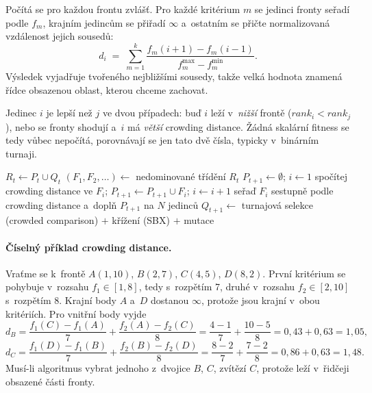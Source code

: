 \documentclass[11pt,a4paper]{article}
\theoremstyle{definition}
\begin{document}
\begin{defbox}
Počítá se pro každou frontu zvlášť. Pro každé kritérium $m$ se jedinci fronty seřadí
podle $f_m$, krajním jedincům se přiřadí $\infty$ a~ostatním se přičte normalizovaná
vzdálenost jejich sousedů:
\[
d_i \;=\; \sum_{m=1}^{k}
\frac{f_m(i+1) - f_m(i-1)}{f_m^{\max} - f_m^{\min}} .
\]
Výsledek vyjadřuje  tvořeného nejbližšími sousedy, takže velká hodnota
znamená řídce obsazenou oblast, kterou chceme zachovat.
\end{defbox}

\begin{defbox}
Jedinec $i$ je lepší než $j$ ve dvou případech: buď $i$ leží v~\emph{nižší} frontě
($rank_i < rank_j$), nebo se fronty shodují a~$i$ má \emph{větší} crowding distance.
Žádná skalární fitness se tedy vůbec nepočítá, porovnávají se jen tato dvě čísla,
typicky v~binárním turnaji.
\end{defbox}

\begin{algorithm}[!ht]
\caption{NSGA-II (jedna generace)}
\begin{algorithmic}[1]
\State $R_t \gets P_t \cup Q_t$ 
\State $(F_1, F_2, \dots) \gets$ nedominované třídění $R_t$
\State $P_{t+1} \gets \emptyset$; $i \gets 1$
  \State spočítej crowding distance ve $F_i$; $P_{t+1} \gets P_{t+1} \cup F_i$; $i \gets i+1$
\EndWhile
\State seřaď $F_i$ sestupně podle crowding distance a~doplň $P_{t+1}$ na $N$ jedinců
\State $Q_{t+1} \gets$ turnajová selekce (crowded comparison) $+$ křížení (SBX) $+$ mutace
\end{algorithmic}
\end{algorithm}

\paragraph{Číselný příklad crowding distance.} Vraťme se k~frontě
$A(1,10)$, $B(2,7)$, $C(4,5)$, $D(8,2)$. První kritérium se pohybuje v~rozsahu
$f_1 \in [1,8]$, tedy s~rozpětím 7, druhé v~rozsahu $f_2 \in [2,10]$ s~rozpětím 8.
Krajní body $A$ a~$D$ dostanou $\infty$, protože jsou krajní v~obou kritériích. Pro
vnitřní body vyjde
\[
d_B = \frac{f_1(C)-f_1(A)}{7} + \frac{f_2(A)-f_2(C)}{8}
    = \frac{4-1}{7} + \frac{10-5}{8} = 0{,}43 + 0{,}63 = 1{,}05,
\]
\[
d_C = \frac{f_1(D)-f_1(B)}{7} + \frac{f_2(B)-f_2(D)}{8}
    = \frac{8-2}{7} + \frac{7-2}{8} = 0{,}86 + 0{,}63 = 1{,}48 .
\]
Musí-li algoritmus vybrat jednoho z~dvojice $B$, $C$, zvítězí $C$, protože leží
v~řidčeji obsazené části fronty.
\end{document}
